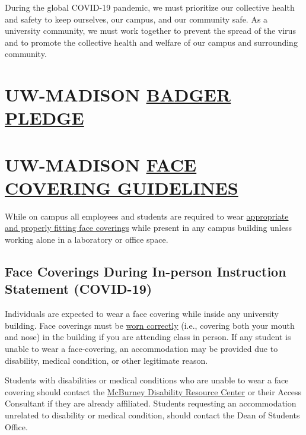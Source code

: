 \documentclass[11pt,man]{article}
\begin{document}
During the global COVID-19 pandemic, we must prioritize our collective
health and safety to keep ourselves, our campus, and our community safe.
As a university community, we must work together to prevent the spread
of the virus and to promote the collective health and welfare of our
campus and surrounding community.

\hypertarget{uw-madison-badger-pledge}{%
\section{\texorpdfstring{UW-MADISON
\href{https://smartrestart.wisc.edu/badgerpledge/}{BADGER
PLEDGE}}{UW-MADISON BADGER PLEDGE}}\label{uw-madison-badger-pledge}}

\hypertarget{uw-madison-face-covering-guidelines}{%
\section{\texorpdfstring{UW-MADISON
\href{https://d1cjb8q1w2lzm7.cloudfront.net/wp-content/uploads/sites/22/2020/06/Cloth-face-cover-guidance-06-22-20-final.pdf}{FACE
COVERING
GUIDELINES}}{UW-MADISON FACE COVERING GUIDELINES}}\label{uw-madison-face-covering-guidelines}}

While on campus all employees and students are required to wear
\href{https://www.cdc.gov/coronavirus/2019-ncov/prevent-getting-sick/how-to-wear-cloth-face-coverings.html}{appropriate
and properly fitting face coverings} while present in any campus
building unless working alone in a laboratory or office space.

\hypertarget{face-coverings-during-in-person-instruction-statement-covid-19}{%
\subsection{Face Coverings During In-person Instruction Statement
(COVID-19)}\label{face-coverings-during-in-person-instruction-statement-covid-19}}

Individuals are expected to wear a face covering while inside any
university building. Face coverings must be
\href{https://www.cdc.gov/coronavirus/2019-ncov/prevent-getting-sick/how-to-wear-cloth-face-coverings.html}{worn
correctly} (i.e., covering both your mouth and nose) in the building if
you are attending class in person. If any student is unable to wear a
face-covering, an accommodation may be provided due to disability,
medical condition, or other legitimate reason.

Students with disabilities or medical conditions who are unable to wear
a face covering should contact the
\href{https://mcburney.wisc.edu/}{McBurney Disability Resource Center}
or their Access Consultant if they are already affiliated. Students
requesting an accommodation unrelated to disability or medical
condition, should contact the Dean of Students Office.
\end{document}
